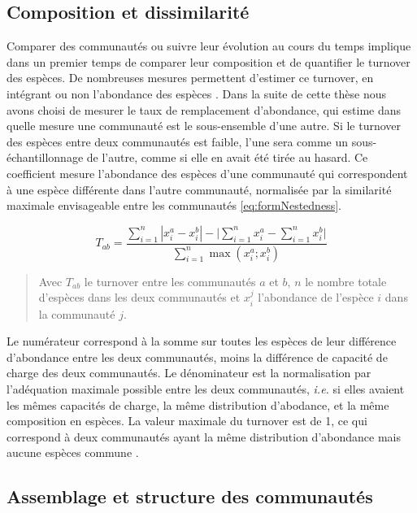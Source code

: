 \documentclass[
  11pt,
  french,
  A4paper,
  extrafontsizes,onecolumn,openright
  ]{memoir}
\begin{document}
\subsection{Composition et
dissimilarité}\label{composition-et-dissimilarite}

Comparer des communautés ou suivre leur évolution au cours du temps
implique dans un premier temps de comparer leur composition et de
quantifier le turnover des espèces. De nombreuses mesures permettent
d'estimer ce turnover, en intégrant ou non l'abondance des espèces
\autocite{Podani2013}. Dans la suite de cette thèse nous avons choisi de
mesurer le taux de remplacement d'abondance, qui estime dans quelle
mesure une communauté est le sous-ensemble d'une autre. Si le turnover
des espèces entre deux communautés est faible, l'une sera comme un
sous-échantillonnage de l'autre, comme si elle en avait été tirée au
hasard. Ce coefficient mesure l'abondance des espèces d'une communauté
qui correspondent à une espèce différente dans l'autre communauté,
normalisée par la similarité maximale envisageable entre les communautés
\eqref{eq:formNestedness}.

\begin{equation}
T_{ab}=\frac{\sum_{i=1}^{n}|x_i^a - x_i^b| - \bigg| \sum_{i=1}^{n}{x_i^a} - \sum_{i=1}^{n}{x_i^b} \bigg|}{\sum_{i=1}^{n}\max{\left( x_i^a;x_i^b \right)}}
\label{eq:formNestedness}
\end{equation}

\begin{quote}
Avec \(T_{ab}\) le turnover entre les communautés \(a\) et \(b\), \(n\)
le nombre totale d'espèces dans les deux communautés et \(x_i^j\)
l'abondance de l'espèce \(i\) dans la communauté \(j\).
\end{quote}

Le numérateur correspond à la somme sur toutes les espèces de leur
différence d'abondance entre les deux communautés, moins la différence
de capacité de charge des deux communautés. Le dénominateur est la
normalisation par l'adéquation maximale possible entre les deux
communautés, \emph{i.e.} si elles avaient les mêmes capacités de charge,
la même distribution d'abodance, et la même composition en espèces. La
valeur maximale du turnover est de 1, ce qui correspond à deux
communautés ayant la même distribution d'abondance mais aucune espèces
commune \autocite{Podani2013}.

\subsection{Assemblage et structure des
communautés}\label{assemblage-et-structure-des-communautes}
\end{document}
